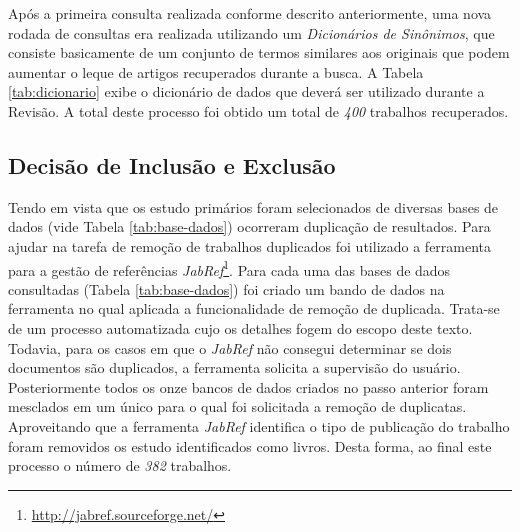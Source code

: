 \documentclass[12pt]{article}
\begin{document}
Após a primeira consulta realizada conforme descrito anteriormente, uma nova
rodada de consultas era realizada utilizando um \textit{Dicionários de Sinônimos}, que consiste basicamente de um conjunto de
termos similares aos originais que podem aumentar o leque de artigos
recuperados durante a busca. A Tabela \ref{tab:dicionario} exibe o dicionário
de dados que deverá ser utilizado durante a Revisão. A total deste processo foi
obtido um total de \textit{400} trabalhos recuperados.

\begin{table}[ht]
\centering
{}
\caption{Dicionário de Sinônimos}
\label{tab:dicionario}
\end{table}

\subsection{Decisão de Inclusão e Exclusão}
\label{subsec:decisao-inclusao}

Tendo em vista que os estudo primários foram selecionados de diversas bases de
dados (vide Tabela \ref{tab:base-dados}) ocorreram duplicação de
resultados. Para ajudar na tarefa de remoção de trabalhos duplicados foi utilizado a
ferramenta para a gestão de referências
\textit{JabRef}\footnote{\url{http://jabref.sourceforge.net/}}. Para cada uma
das bases de dados consultadas (Tabela \ref{tab:base-dados}) foi criado um
bando de dados na ferramenta no qual aplicada a funcionalidade de remoção de
duplicada. Trata-se de um processo automatizada cujo os detalhes fogem do
escopo deste texto. Todavia, para os casos em que o \textit{JabRef} não
consegui determinar se dois documentos são duplicados, a ferramenta solicita a
supervisão do usuário. Posteriormente todos os onze bancos de dados criados no
passo anterior foram mesclados em um único para o qual foi solicitada a remoção
de duplicatas. Aproveitando que a ferramenta \textit{JabRef} identifica o tipo
de publicação do trabalho foram removidos os estudo identificados como livros.
Desta forma, ao final este processo o número de \textit{382} trabalhos.
\end{document}
